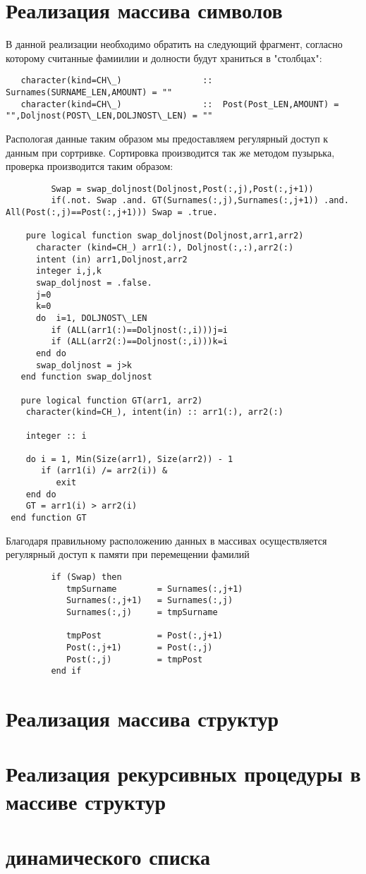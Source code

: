 \section{Реализация массива символов}
В данной реализации необходимо обратить на следующий фрагмент, согласно которому считанные фамиилии и долности будут храниться в "столбцах":
\begin{lstlisting}
   character(kind=CH\_)                ::  Surnames(SURNAME_LEN,AMOUNT) = ""
   character(kind=CH\_)                ::  Post(Post_LEN,AMOUNT) = "",Doljnost(POST\_LEN,DOLJNOST\_LEN) = ""
\end{lstlisting}
Распологая данные таким образом мы предоставляем регулярный доступ к данным при сортривке.
Сортировка производится так же методом пузырька, проверка производится таким образом:
\begin{lstlisting}
         Swap = swap_doljnost(Doljnost,Post(:,j),Post(:,j+1))
         if(.not. Swap .and. GT(Surnames(:,j),Surnames(:,j+1)) .and. All(Post(:,j)==Post(:,j+1))) Swap = .true.
    
    pure logical function swap_doljnost(Doljnost,arr1,arr2)
      character (kind=CH_) arr1(:), Doljnost(:,:),arr2(:)
      intent (in) arr1,Doljnost,arr2
      integer i,j,k
      swap_doljnost = .false.
      j=0
      k=0
      do  i=1, DOLJNOST\_LEN
         if (ALL(arr1(:)==Doljnost(:,i)))j=i
         if (ALL(arr2(:)==Doljnost(:,i)))k=i
      end do
      swap_doljnost = j>k
   end function swap_doljnost

   pure logical function GT(arr1, arr2)
    character(kind=CH_), intent(in) :: arr1(:), arr2(:)

    integer :: i

    do i = 1, Min(Size(arr1), Size(arr2)) - 1
       if (arr1(i) /= arr2(i)) &
          exit
    end do
    GT = arr1(i) > arr2(i)
 end function GT
\end{lstlisting}
 Благодаря правильному расположению данных в массивах осуществляется регулярный доступ к памяти при перемещении фамилий
\begin{lstlisting}
         if (Swap) then
            tmpSurname        = Surnames(:,j+1)
            Surnames(:,j+1)   = Surnames(:,j)
            Surnames(:,j)     = tmpSurname

            tmpPost           = Post(:,j+1)
            Post(:,j+1)       = Post(:,j)
            Post(:,j)         = tmpPost
         end if
\end{lstlisting}
\section{Реализация массива структур}
\section{Реализация рекурсивных процедуры в массиве структур}
\section{динамического списка}
